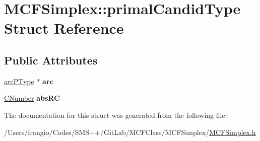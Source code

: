 \hypertarget{struct_m_c_f_simplex_1_1primal_candid_type}{}\section{M\+C\+F\+Simplex\+:\+:primal\+Candid\+Type Struct Reference}
\label{struct_m_c_f_simplex_1_1primal_candid_type}
\subsection*{Public Attributes}
\begin{DoxyCompactItemize}
\item 
\mbox{\label{struct_m_c_f_simplex_1_1primal_candid_type_ae11b175232a1bff6c7692f89002ea883}} 
\mbox{\hyperlink{struct_m_c_f_simplex_1_1arc_p_type}{arc\+P\+Type}} $\ast$ {\bfseries arc}
\item 
\mbox{\label{struct_m_c_f_simplex_1_1primal_candid_type_aa9a76edc5293f7405610d984144cde3a}} 
\mbox{\hyperlink{class_m_c_f_class_a24d0627ba8213afe1ec4ebeb4508e8f1}{C\+Number}} {\bfseries abs\+RC}
\end{DoxyCompactItemize}


The documentation for this struct was generated from the following file\+:\begin{DoxyCompactItemize}
\item 
/\+Users/frangio/\+Codes/\+S\+M\+S++/\+Git\+Lab/\+M\+C\+F\+Class/\+M\+C\+F\+Simplex/\mbox{\hyperlink{_m_c_f_simplex_8h}{M\+C\+F\+Simplex.\+h}}\end{DoxyCompactItemize}
